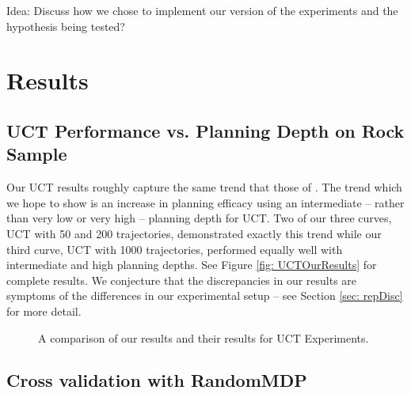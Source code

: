 \documentclass[11pt,twocolumn]{article}
\begin{document}
Idea: Discuss how we chose to implement our version of the experiments and the hypothesis being tested?

\section{Results}


\subsection{UCT Performance vs. Planning Depth on Rock Sample}
Our UCT results roughly capture the same trend that those of \cite{jiang2015dependence}. The trend which we hope to show is an increase in planning efficacy using an intermediate -- rather than very low or very high -- planning depth for UCT. Two of our three curves, UCT with 50 and 200 trajectories, demonstrated exactly this trend while our third curve, UCT with 1000 trajectories, performed equally well with intermediate and high planning depths. See Figure \ref{fig: UCTOurResults} for complete results. We conjecture that the discrepancies in our results are symptoms of the differences in our experimental setup -- see Section \ref{sec: repDisc} for more detail.

\begin{figure}[h]
\centering
{}
\hspace{1mm}
\caption{A comparison of our results and their results for UCT Experiments.}
\end{figure}

\subsection{Cross validation with RandomMDP}
\end{document}
